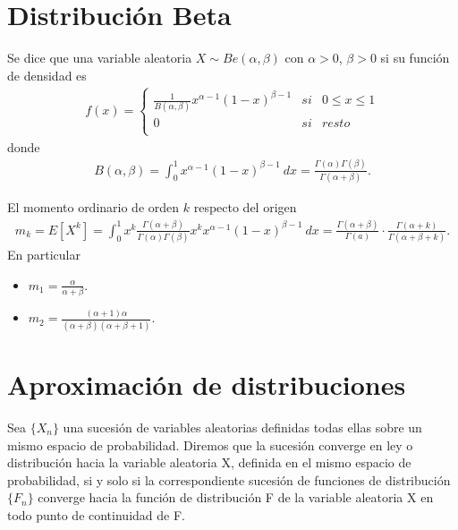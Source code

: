 \section{Distribución Beta}

\begin{defi}
    Se dice que una variable aleatoria $X \sim Be(\alpha, \beta)$ con $\alpha > 0$, $\beta > 0$ si su función de densidad es
    \begin{align*}
        f(x) = \left\{ \begin{array}{lcc}
                           \frac{1}{B(\alpha, \beta)}x^{\alpha - 1}(1 - x)^{\beta - 1} & si & 0 \leq x \leq 1 \\
                           0                                                           & si & resto           \\
                       \end{array}
        \right.
    \end{align*}
    donde
    \begin{align*}
        B(\alpha, \beta) = \int_{0}^{1}{x^{\alpha - 1}(1 - x)^{\beta - 1} \ dx} = \frac{\Gamma(\alpha)\Gamma(\beta)}{\Gamma(\alpha + \beta)}.
    \end{align*}
\end{defi}

\begin{obs}
    El momento ordinario de orden $k$ respecto del origen
    \begin{align*}
        m_k = E[X^k] = \int_{0}^{1}{x^k\frac{\Gamma(\alpha + \beta)}{\Gamma(\alpha)\Gamma(\beta)}x^kx^{\alpha -1}(1-x)^{\beta -1} \ dx} = \frac{\Gamma(\alpha + \beta)}{\Gamma(a)} \cdot \frac{\Gamma(\alpha + k)}{\Gamma(\alpha + \beta + k)}.
    \end{align*}
    En particular
    \begin{itemize}
        \item $m_1 = \frac{\alpha}{\alpha + \beta}$.
        \item $m_2 = \frac{(\alpha + 1)\alpha}{(\alpha + \beta)(\alpha + \beta + 1)}$.
    \end{itemize}
\end{obs}

\section{Aproximación de distribuciones}

\begin{defi}
    Sea $\{X_n\}$ una sucesión de variables aleatorias definidas todas ellas sobre un mismo espacio de probabilidad. Diremos que la sucesión converge en ley o distribución hacia la variable aleatoria X, definida en el mismo espacio de probabilidad, si y solo si la correspondiente sucesión de funciones de distribución $\{F_n\}$ converge hacia la función de distribución F de la variable aleatoria X en todo punto de continuidad de F.
\end{defi}

